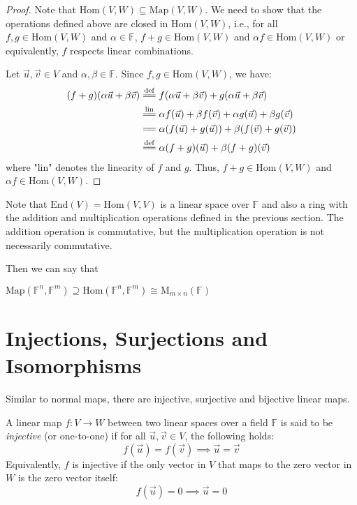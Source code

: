\documentclass[
	11pt, %
	fleqn, %
	a4paper, %
]{LegrandOrangeBook}
\newcommand{\End}[1]{\text{End}(#1)} %
\newcommand{\Hom}[2]{\text{Hom}(#1, #2)} %
\newcommand{\F}{\mathbb{F}} %
\newcommand{\M}[2]{\text{M}_{#1}(#2)} %
\newcommand{\Map}[2]{\text{Map}(#1, #2)} %
\begin{document}
\begin{proof}
    Note that $\Hom{V}{W} \subseteq \Map{V}{W}$. We need to show that the operations defined above are closed in $\Hom{V}{W}$, i.e., for all $f, g \in \Hom{V}{W}$ and $\alpha \in \F$, $f + g \in \Hom{V}{W}$ and $\alpha f \in \Hom{V}{W}$ or equivalently, $f$ respects linear combinations.

    Let $\vec{u}, \vec{v} \in V$ and $\alpha, \beta \in \F$. Since $f, g \in \Hom{V}{W}$, we have:
    \[
        \begin{split}
            (f + g)(\alpha\vec{u} + \beta\vec{v}) &\overset{\mathrm{def}}{=\joinrel=} f(\alpha\vec{u} + \beta\vec{v}) + g(\alpha\vec{u} + \beta\vec{v}) \\
            &\overset{\mathrm{lin}}{=\joinrel=} \alpha f(\vec{u}) + \beta f(\vec{v}) + \alpha g(\vec{u}) + \beta g(\vec{v}) \\
            &=\joinrel= \alpha (f(\vec{u}) + g(\vec{u})) + \beta (f(\vec{v}) + g(\vec{v})) \\
            &\overset{\mathrm{def}}{=\joinrel=} \alpha (f + g)(\vec{u}) + \beta (f + g)(\vec{v})
        \end{split}
    \]
    where "lin" denotes the linearity of $f$ and $g$. Thus, $f + g \in \Hom{V}{W}$ and $\alpha f \in \Hom{V}{W}$.
\end{proof}

\begin{remark}
    Note that $\End{V} = \Hom{V}{V}$ is a linear space over $\F$ and also a ring with the addition and multiplication operations defined in the previous section. The addition operation is commutative, but the multiplication operation is not necessarily commutative.
\end{remark}

Then we can say that 
\begin{center}
    $\Map{\F^n}{\F^m} \supseteq \Hom{\F^n}{\F^m} \cong \M{m \times n}{\F}$
\end{center}


\newpage

\section{Injections, Surjections and Isomorphisms}

Similar to normal maps, there are injective, surjective and bijective linear maps.

\begin{definition}
    A linear map $f: V \to W$ between two linear spaces over a field $\F$ is said to be \emph{injective} (or one-to-one) if for all $\vec{u}, \vec{v} \in V$, the following holds:
    \[
        f(\vec{u}) = f(\vec{v}) \implies \vec{u} = \vec{v}
    \]
    Equivalently, $f$ is injective if the only vector in $V$ that maps to the zero vector in $W$ is the zero vector itself:
    \[
        f(\vec{u}) = 0 \implies \vec{u} = 0
    \]
\end{definition}
\end{document}
